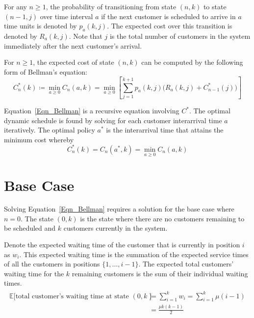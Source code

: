 For any $n \geq 1$, the probability of transitioning from state $(n, k)$ to state $(n - 1, j)$ over time interval $a$ if the next customer is scheduled to arrive in $a$ time units is denoted by $p_{a} (k, j)$. The expected cost over this transition is denoted by $R_{a} (k, j)$. Note that $j$ is the total number of customers in the system immediately after the next customer's arrival.

For $n \geq 1$, the expected cost of state $(n, k)$ can be computed by the following form of Bellman's equation:
\begin{equation}
	C_{n}^{*} (k) \coloneqq \min_{a \geq 0} C_{n} (a, k) = \min_{a \geq 0} \left[ \sum_{j = 1}^{k + 1} p_{a} (k, j) \Big( R_{a} (k, j) + C_{n - 1}^{*} (j) \Big) \right]
	\label{Eqn_Bellman}
\end{equation}

Equation~\ref{Eqn_Bellman} is a recursive equation involving $C^{*}$. The optimal dynamic schedule is found by solving for each customer interarrival time $a$ iteratively. The optimal policy $a^{*}$ is the interarrival time that attains the minimum cost whereby
\begin{equation}
	C_{n}^{*} (k) = C_{n} (a^{*}, k) = \min_{a \geq 0} C_{n} (a, k)
\end{equation}

\section{Base Case}
Solving Equation~\ref{Eqn_Bellman} requires a solution for the base case where $n = 0$. The state $(0, k)$ is the state where there are no customers remaining to be scheduled and $k$ customers currently in the system.

Denote the expected waiting time of the customer that is currently in position $i$ as $w_{i}$. This expected waiting time is the summation of the expected service times of all the customers in positions $\{ 1, \ldots, i - 1 \}$. The expected total customers' waiting time for the $k$ remaining customers is the sum of their individual waiting times.
\begin{align}
	\begin{split}
		\mathbb{E} \Big[\text{total customer's waiting time at state $(0, k)$} \Big] & = \sum_{i = 1}^{k} w_{i} = \sum_{i = 1}^{k} \mu (i - 1) \\
		& = \frac{\mu k (k - 1)}{2}
	\end{split}
\end{align}

